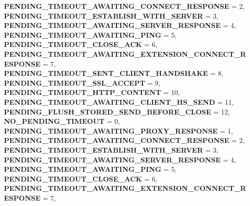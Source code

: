 \begin{DoxyCompactItemize}
{\bfseries P\+E\+N\+D\+I\+N\+G\+\_\+\+T\+I\+M\+E\+O\+U\+T\+\_\+\+A\+W\+A\+I\+T\+I\+N\+G\+\_\+\+C\+O\+N\+N\+E\+C\+T\+\_\+\+R\+E\+S\+P\+O\+N\+SE} = 2, 
\newline
{\bfseries P\+E\+N\+D\+I\+N\+G\+\_\+\+T\+I\+M\+E\+O\+U\+T\+\_\+\+E\+S\+T\+A\+B\+L\+I\+S\+H\+\_\+\+W\+I\+T\+H\+\_\+\+S\+E\+R\+V\+ER} = 3, 
{\bfseries P\+E\+N\+D\+I\+N\+G\+\_\+\+T\+I\+M\+E\+O\+U\+T\+\_\+\+A\+W\+A\+I\+T\+I\+N\+G\+\_\+\+S\+E\+R\+V\+E\+R\+\_\+\+R\+E\+S\+P\+O\+N\+SE} = 4, 
{\bfseries P\+E\+N\+D\+I\+N\+G\+\_\+\+T\+I\+M\+E\+O\+U\+T\+\_\+\+A\+W\+A\+I\+T\+I\+N\+G\+\_\+\+P\+I\+NG} = 5, 
{\bfseries P\+E\+N\+D\+I\+N\+G\+\_\+\+T\+I\+M\+E\+O\+U\+T\+\_\+\+C\+L\+O\+S\+E\+\_\+\+A\+CK} = 6, 
\newline
{\bfseries P\+E\+N\+D\+I\+N\+G\+\_\+\+T\+I\+M\+E\+O\+U\+T\+\_\+\+A\+W\+A\+I\+T\+I\+N\+G\+\_\+\+E\+X\+T\+E\+N\+S\+I\+O\+N\+\_\+\+C\+O\+N\+N\+E\+C\+T\+\_\+\+R\+E\+S\+P\+O\+N\+SE} = 7, 
{\bfseries P\+E\+N\+D\+I\+N\+G\+\_\+\+T\+I\+M\+E\+O\+U\+T\+\_\+\+S\+E\+N\+T\+\_\+\+C\+L\+I\+E\+N\+T\+\_\+\+H\+A\+N\+D\+S\+H\+A\+KE} = 8, 
{\bfseries P\+E\+N\+D\+I\+N\+G\+\_\+\+T\+I\+M\+E\+O\+U\+T\+\_\+\+S\+S\+L\+\_\+\+A\+C\+C\+E\+PT} = 9, 
{\bfseries P\+E\+N\+D\+I\+N\+G\+\_\+\+T\+I\+M\+E\+O\+U\+T\+\_\+\+H\+T\+T\+P\+\_\+\+C\+O\+N\+T\+E\+NT} = 10, 
\newline
{\bfseries P\+E\+N\+D\+I\+N\+G\+\_\+\+T\+I\+M\+E\+O\+U\+T\+\_\+\+A\+W\+A\+I\+T\+I\+N\+G\+\_\+\+C\+L\+I\+E\+N\+T\+\_\+\+H\+S\+\_\+\+S\+E\+ND} = 11, 
{\bfseries P\+E\+N\+D\+I\+N\+G\+\_\+\+F\+L\+U\+S\+H\+\_\+\+S\+T\+O\+R\+E\+D\+\_\+\+S\+E\+N\+D\+\_\+\+B\+E\+F\+O\+R\+E\+\_\+\+C\+L\+O\+SE} = 12, 
{\bfseries N\+O\+\_\+\+P\+E\+N\+D\+I\+N\+G\+\_\+\+T\+I\+M\+E\+O\+UT} = 0, 
{\bfseries P\+E\+N\+D\+I\+N\+G\+\_\+\+T\+I\+M\+E\+O\+U\+T\+\_\+\+A\+W\+A\+I\+T\+I\+N\+G\+\_\+\+P\+R\+O\+X\+Y\+\_\+\+R\+E\+S\+P\+O\+N\+SE} = 1, 
\newline
{\bfseries P\+E\+N\+D\+I\+N\+G\+\_\+\+T\+I\+M\+E\+O\+U\+T\+\_\+\+A\+W\+A\+I\+T\+I\+N\+G\+\_\+\+C\+O\+N\+N\+E\+C\+T\+\_\+\+R\+E\+S\+P\+O\+N\+SE} = 2, 
{\bfseries P\+E\+N\+D\+I\+N\+G\+\_\+\+T\+I\+M\+E\+O\+U\+T\+\_\+\+E\+S\+T\+A\+B\+L\+I\+S\+H\+\_\+\+W\+I\+T\+H\+\_\+\+S\+E\+R\+V\+ER} = 3, 
{\bfseries P\+E\+N\+D\+I\+N\+G\+\_\+\+T\+I\+M\+E\+O\+U\+T\+\_\+\+A\+W\+A\+I\+T\+I\+N\+G\+\_\+\+S\+E\+R\+V\+E\+R\+\_\+\+R\+E\+S\+P\+O\+N\+SE} = 4, 
{\bfseries P\+E\+N\+D\+I\+N\+G\+\_\+\+T\+I\+M\+E\+O\+U\+T\+\_\+\+A\+W\+A\+I\+T\+I\+N\+G\+\_\+\+P\+I\+NG} = 5, 
\newline
{\bfseries P\+E\+N\+D\+I\+N\+G\+\_\+\+T\+I\+M\+E\+O\+U\+T\+\_\+\+C\+L\+O\+S\+E\+\_\+\+A\+CK} = 6, 
{\bfseries P\+E\+N\+D\+I\+N\+G\+\_\+\+T\+I\+M\+E\+O\+U\+T\+\_\+\+A\+W\+A\+I\+T\+I\+N\+G\+\_\+\+E\+X\+T\+E\+N\+S\+I\+O\+N\+\_\+\+C\+O\+N\+N\+E\+C\+T\+\_\+\+R\+E\+S\+P\+O\+N\+SE} = 7, 

\end{DoxyCompactItemize}
